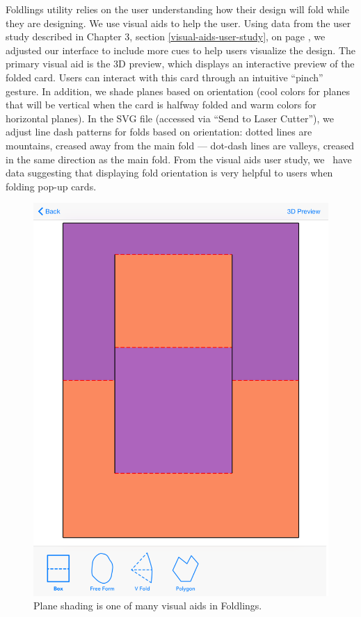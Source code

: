Foldlings utility relies on the user understanding how their design will
fold while they are designing. We use visual aids to help the user.
Using data from the user study described in Chapter 3, section
\ref{visual-aids-user-study}, on page \pageref{visual-aids-user-study},
we adjusted our interface to include more cues to help users visualize
the design. The primary visual aid is the 3D preview, which displays an
interactive preview of the folded card. Users can interact with this
card through an intuitive ``pinch'' gesture. In addition, we shade
planes based on orientation (cool colors for planes that will be
vertical when the card is halfway folded and warm colors for horizontal
planes). In the SVG file (accessed via ``Send to Laser Cutter''), we
adjust line dash patterns for folds based on orientation: dotted lines
are mountains, creased away from the main fold --- dot-dash lines are
valleys, creased in the same direction as the main fold. From the visual
aids user study, we ~have data suggesting that displaying fold
orientation is very helpful to users when folding pop-up cards.

\begin{figure}[htbp]
\centering
\includegraphics{figures/32_UI_Tool_Interactions/currentInterface.png}
\caption{Plane shading is one of many visual aids in Foldlings.}
\end{figure}
